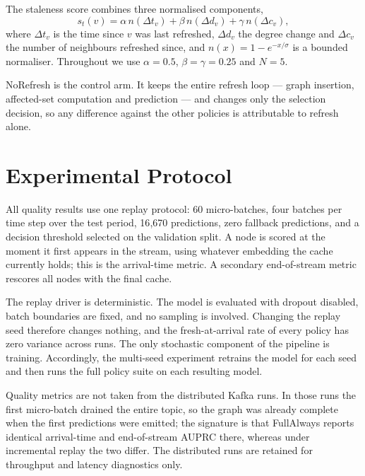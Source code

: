 \documentclass[conference]{IEEEtran}
\begin{document}
The staleness score combines three normalised components,
\begin{equation}
s_t(v)=\alpha\,n(\Delta t_v)+\beta\,n(\Delta d_v)+\gamma\,n(\Delta c_v),
\end{equation}
where $\Delta t_v$ is the time since $v$ was last refreshed, $\Delta d_v$ the
degree change and $\Delta c_v$ the number of neighbours refreshed since, and
$n(x)=1-e^{-x/\sigma}$ is a bounded normaliser. Throughout we use
$\alpha=0.5$, $\beta=\gamma=0.25$ and $N=5$.

NoRefresh is the control arm. It keeps the entire refresh loop --- graph
insertion, affected-set computation and prediction --- and changes only the
selection decision, so any difference against the other policies is
attributable to refresh alone.

\section{Experimental Protocol}
\label{sec:protocol}

All quality results use one replay protocol: 60 micro-batches, four batches per
time step over the test period, 16{,}670 predictions, zero fallback
predictions, and a decision threshold selected on the validation split. A node
is scored at the moment it first appears in the stream, using whatever
embedding the cache currently holds; this is the arrival-time metric. A
secondary end-of-stream metric rescores all nodes with the final cache.

The replay driver is deterministic. The model is evaluated with dropout
disabled, batch boundaries are fixed, and no sampling is involved. Changing the
replay seed therefore changes nothing, and the fresh-at-arrival rate of every
policy has zero variance across runs. The only stochastic component of the
pipeline is training. Accordingly, the multi-seed experiment retrains the model
for each seed and then runs the full policy suite on each resulting model.

Quality metrics are not taken from the distributed Kafka runs. In those runs
the first micro-batch drained the entire topic, so the graph was already
complete when the first predictions were emitted; the signature is that
FullAlways reports identical arrival-time and end-of-stream AUPRC there,
whereas under incremental replay the two differ. The distributed runs are
retained for throughput and latency diagnostics only.
\end{document}
